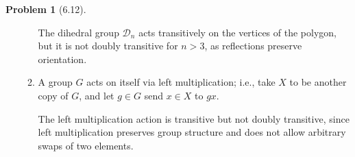 \documentclass[12pt]{article}
\theoremstyle{definition}
\newtheorem{problem}{Problem}
\begin{document}
\begin{problem}[6.12]
\begin{enumerate}[label=(\alph*)]
\begin{enumerate}[label=(\arabic*)]
                        \begin{solution}
                            The dihedral group $\mathcal{D}_n$ acts transitively on the vertices of the polygon, but it is not doubly transitive for $n > 3$, as reflections preserve orientation. 
                        \end{solution}

                  \item A group $G$ acts on itself via left multiplication; i.e., take $X$ to be another copy of $G$, and let $g \in G$ send $x \in X$ to $gx$.
                  
                        \begin{solution}
                            The left multiplication action is transitive but not doubly transitive, since left multiplication preserves group structure and does not allow arbitrary swaps of two elements.
                        \end{solution}
              \end{enumerate}
    \end{enumerate}
\end{problem}
\end{document}
